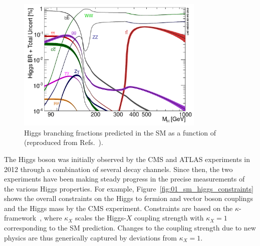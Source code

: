 \begin{figure}[ht]
	\centering
	\includegraphics[width=0.8\textwidth]{figures/01-SM-03-SM/higgs/Higgs_BR_RECT.pdf}
	\caption{Higgs branching fractions predicted in the SM as a function of \mh (reproduced from Refs.~\cite{Dittmaier:2012vm,LHCHiggsCrossSectionWorkingGroup:2016ypw}).}
	\label{fig:01_sm_higgs_hbrs}
\end{figure}

The Higgs boson was initially observed by the CMS and ATLAS experiments in 2012 through a combination of several decay channels.
Since then, the two experiments have been making steady progress in the precise measurements of the various Higgs properties.
For example, Figure~\ref{fig:01_sm_higgs_constraints} shows the overall constraints on the Higgs to fermion and vector boson couplings and the Higgs mass by the CMS experiment.
Constraints are based on the $\kappa$-framework~\cite{LHCHiggsCrossSectionWorkingGroup:2013rie}, where $\kappa_X$ scales the Higgs-$X$ coupling strength with $\kappa_X = 1$ corresponding to the SM prediction.
Changes to the coupling strength due to new physics are thus generically captured by deviations from $\kappa_X = 1$.


